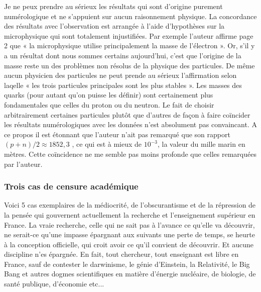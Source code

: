 \documentclass[a4paper,12pt]{article}
\begin{document}
Je ne peux prendre au sérieux les résultats qui sont d’origine purement numérologique et ne s’appuient sur aucun raisonnement physique. La concordance des résultats avec l’observation est arrangée à l’aide d’hypothèses sur la microphysique qui sont totalement injustifiées. Par exemple l’auteur affirme page 2 que « la microphysique utilise principalement la masse de l’électron ». Or, s’il y a un résultat dont nous sommes certains aujourd’hui, c’est que l’origine de la masse reste un des problèmes non résolus de la physique des particules. De même aucun physicien des particules ne peut prende au sérieux l’affirmation selon laqelle « les trois particules principales sont les plus stables ». Les masses des quarks (pour autant qu’on puisse les définir) sont certainement plus fondamentales que celles du proton ou du neutron. Le fait de choisir arbitrairement certaines particules plutôt que d’autres de façon à faire coïncider les résultats numérologiques avec les données n’est absolument pas convaincant. A ce propos il est étonnant que l’auteur n’ait pas remarqué que son rapport $(p+n)/2 \approx 1852,3$ , ce qui est à mieux de $10^{-3}$, la valeur du mille marin en mètres. Cette coïncidence ne me semble pas moins profonde que celles remarquées par l’auteur.    



\subsubsection{Trois cas de censure académique}

Voici 5 cas exemplaires de la médiocrité, de l’obscurantisme et de la répression de la pensée qui gouvernent actuellement la recherche et l’enseignement supérieur en France. La vraie recherche, celle qui ne sait pas à l’avance ce qu’elle va découvrir, ne serait-ce qu’une impasse épargnant aux suivants une perte de temps, se heurte à la conception officielle, qui croit avoir ce qu’il convient de découvrir. Et aucune discipline n’es épargnée. En fait, tout chercheur, tout enseignant est libre en France, sauf de contester le darwinisme, le génie d’Einstein, la Relativité, le Big Bang et autres dogmes scientifiques en matière d’énergie nucléaire, de biologie, de santé publique, d’économie etc...  
\end{document}

